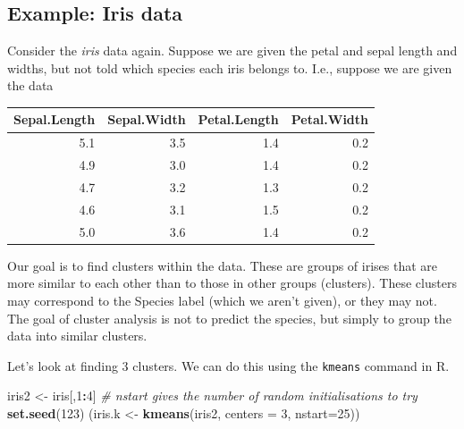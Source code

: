 \documentclass[
]{book}
\newenvironment{Shaded}{\begin{snugshade}}{\end{snugshade}}
\newcommand{\AttributeTok}[1]{\textcolor[rgb]{0.13,0.29,0.53}{#1}}
\newcommand{\CommentTok}[1]{\textcolor[rgb]{0.56,0.35,0.01}{\textit{#1}}}
\newcommand{\DecValTok}[1]{\textcolor[rgb]{0.00,0.00,0.81}{#1}}
\newcommand{\FunctionTok}[1]{\textcolor[rgb]{0.13,0.29,0.53}{\textbf{#1}}}
\newcommand{\NormalTok}[1]{#1}
\newcommand{\OtherTok}[1]{\textcolor[rgb]{0.56,0.35,0.01}{#1}}
\newcommand{\SpecialCharTok}[1]{\textcolor[rgb]{0.81,0.36,0.00}{\textbf{#1}}}
\theoremstyle{definition}
\theoremstyle{definition}
\theoremstyle{definition}
\theoremstyle{definition}
\theoremstyle{remark}
\begin{document}
\subsection{Example: Iris data}\label{example-iris-data}

Consider the \emph{iris} data again. Suppose we are given the petal and sepal length and widths, but not told which species each iris belongs to. I.e., suppose we are given the data

\begin{table}
\centering
\begin{tabular}{rrrr}
\toprule
Sepal.Length & Sepal.Width & Petal.Length & Petal.Width\\
\midrule
5.1 & 3.5 & 1.4 & 0.2\\
4.9 & 3.0 & 1.4 & 0.2\\
4.7 & 3.2 & 1.3 & 0.2\\
4.6 & 3.1 & 1.5 & 0.2\\
5.0 & 3.6 & 1.4 & 0.2\\
\bottomrule
\end{tabular}
\end{table}

Our goal is to find clusters within the data. These are groups of irises that are more similar to each other than to those in other groups (clusters). These clusters may correspond to the Species label (which we aren't given), or they may not. The goal of cluster analysis is not to predict the species, but simply to group the data into similar clusters.

Let's look at finding 3 clusters. We can do this using the \texttt{kmeans} command in R.

\begin{Shaded}
\begin{Highlighting}[]
\NormalTok{iris2 }\OtherTok{\textless{}{-}}\NormalTok{ iris[,}\DecValTok{1}\SpecialCharTok{:}\DecValTok{4}\NormalTok{]}
\CommentTok{\# nstart gives the number of random initialisations to try }
\FunctionTok{set.seed}\NormalTok{(}\DecValTok{123}\NormalTok{)}
\NormalTok{(iris.k }\OtherTok{\textless{}{-}} \FunctionTok{kmeans}\NormalTok{(iris2, }\AttributeTok{centers =} \DecValTok{3}\NormalTok{, }\AttributeTok{nstart=}\DecValTok{25}\NormalTok{)) }
\end{Highlighting}
\end{Shaded}
\end{document}
